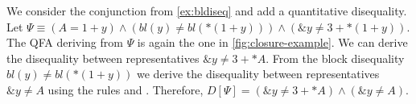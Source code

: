 \begin{example}
    We consider the conjunction from \cref{ex:bldiseq} and add a quantitative disequality.
    Let $\Psi \equiv (A = 1 + y) \land (bl(y) \neq bl(*(1 + y))) \land (\&y \neq 3 + *(1+y)) $.
    The QFA deriving from $\Psi$ is again the one in \cref{fig:closure-example}.
    We can derive the disequality between representatives $\&y \neq 3 + *A$.
    From the block disequality $bl(y) \neq bl(*(1 + y))$ we derive the disequality between representatives $\&y \neq A$ using the rules  and .
    Therefore, $D[\Psi] = (\&y \neq 3 + *A) \land (\&y \neq A)$.
  \end{example}
